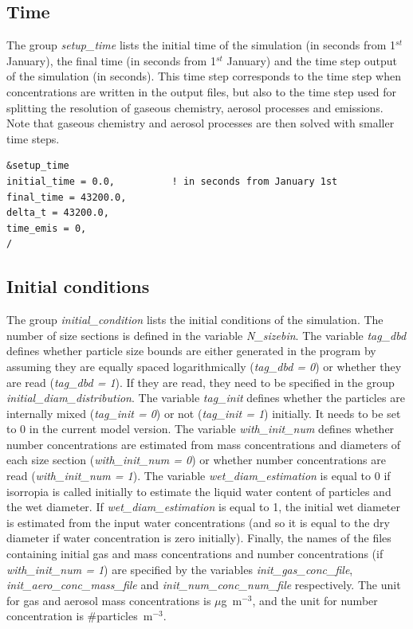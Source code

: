 \documentclass[a4paper,11pt]{article}
\begin{document}
\subsection{Time}

The group {\textit{setup\_time}} lists the initial time of the simulation (in seconds from 1$^{st}$ January), the final time (in seconds from 1$^{st}$ January) and the time step output of the simulation (in seconds). This time step corresponds to the time step when concentrations are written in the output files, but also to the time step used for splitting the resolution of gaseous chemistry, aerosol processes and emissions. Note that gaseous chemistry and aerosol processes are then solved with smaller time steps.

\begin{verbatim}
&setup_time
initial_time = 0.0,          ! in seconds from January 1st   
final_time = 43200.0,             
delta_t = 43200.0,                 
time_emis = 0,        	 
/
\end{verbatim}

\subsection{Initial conditions}
 
The group {\textit{initial\_condition}} lists the initial conditions of the simulation. The number of size sections is defined in the variable {\textit{N\_sizebin}}. The variable {\textit{tag\_dbd}} defines whether particle size bounds are either generated in the program by assuming they are equally spaced logarithmically ({\textit{tag\_dbd = 0}}) or whether they are read ({\textit{tag\_dbd = 1}}). If they are read, they need to be specified in the group {\textit{initial\_diam\_distribution}}.
The variable {\textit{tag\_init}} defines whether the particles are internally mixed ({\textit{tag\_init = 0}}) or not ({\textit{tag\_init = 1}}) initially. It needs to be set to 0 in the current model version.
The variable {\textit{with\_init\_num}} defines whether number concentrations are estimated from mass concentrations and diameters of each size section ({\textit{with\_init\_num = 0}}) or whether number concentrations are read ({\textit{with\_init\_num = 1}}).
The variable {\textit{wet\_diam\_estimation}} is equal to 0 if isorropia is called
initially to estimate the liquid water content of particles and the wet
diameter. If {\textit{wet\_diam\_estimation}} is equal to 1, the initial wet diameter is
estimated from the input water concentrations (and so it is equal to the dry
diameter if water concentration is zero initially).
Finally, the names of the files containing initial gas and mass concentrations and number concentrations (if {\textit{with\_init\_num = 1}}) are specified by the variables {\textit{init\_gas\_conc\_file}}, {\textit{init\_aero\_conc\_mass\_file}} and {\textit{init\_num\_conc\_num\_file}} respectively.
The unit for gas and aerosol mass concentrations is $\mu$g~m$^{-3}$, and the unit for number concentration is \#particles~m$^{-3}$.
\end{document}
